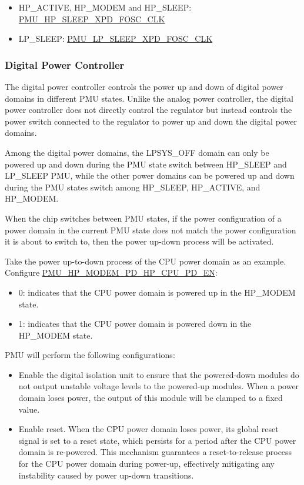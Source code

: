 \documentclass[main\_\_EN.tex]{subfiles}
\begin{document}
\begin{itemize}
    \item HP\_ACTIVE, HP\_MODEM and HP\_SLEEP: \hyperref[fielddesc:PMUHPSLEEPXPDFOSCCLK]{PMU\_HP\_SLEEP\_XPD\_FOSC\_CLK}
    \item LP\_SLEEP: \hyperref[fielddesc:PMULPSLEEPXPDFOSCCLK]{PMU\_LP\_SLEEP\_XPD\_FOSC\_CLK}
\end{itemize}

\subsubsection{Digital Power Controller}

The digital power controller controls the power up and down of digital power domains in different PMU states. Unlike the analog power controller, the digital power controller does not directly control the regulator but instead controls the power switch connected to the regulator to power up and down the digital power domains.

Among the digital power domains, the LPSYS\_OFF domain can only be powered up and down during the PMU state switch between HP\_SLEEP and LP\_SLEEP PMU, while the other power domains can be powered up and down during the PMU states switch among HP\_SLEEP, HP\_ACTIVE, and HP\_MODEM.

When the chip switches between PMU states, if the power configuration of a power domain in the current PMU state does not match the power configuration it is about to switch to, then the power up-down process will be activated.

Take the power up-to-down process of the CPU power domain as an example. Configure \hyperref[fielddesc:PMUHPMODEMPDHPCPUPDEN]{PMU\_HP\_MODEM\_PD\_HP\_CPU\_PD\_EN}:
\begin{itemize}
    \item 0: indicates that the CPU power domain is powered up in the HP\_MODEM state.
    \item 1: indicates that the CPU power domain is powered down in the HP\_MODEM state.
\end{itemize}

PMU will perform the following configurations:

\begin{itemize}
\item Enable the digital isolation unit to ensure that the powered-down modules do not output unstable voltage levels to the powered-up modules. When a power domain loses power, the output of this module will be clamped to a fixed value.

\item Enable reset. When the CPU power domain loses power, its global reset signal is set to a reset state, which persists for a period after the CPU power domain is re-powered. This mechanism guarantees a reset-to-release process for the CPU power domain during power-up, effectively mitigating any instability caused by power up-down transitions.
\end{itemize}
\end{document}

